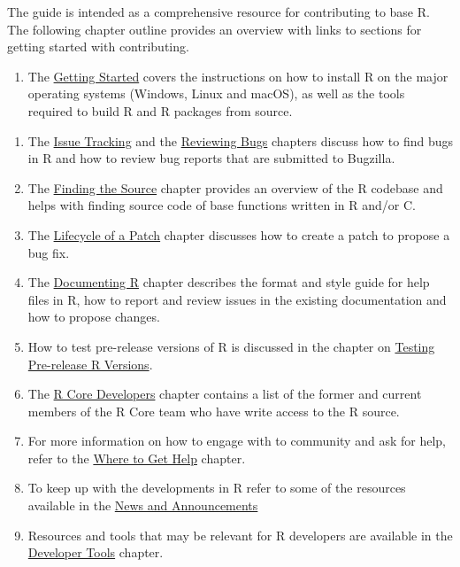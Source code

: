 \documentclass[
]{book}
\providecommand{\tightlist}{%
  \setlength{\itemsep}{0pt}\setlength{\parskip}{0pt}}
\begin{document}
The guide is intended as a comprehensive resource for contributing to base R. The following chapter outline provides an overview with links to sections for getting started with contributing.

\begin{enumerate}
\def\labelenumi{\arabic{enumi}.}
\tightlist
\item
  The \hyperref[GetStart]{Getting Started} covers the instructions on how to install R on the major operating systems (Windows, Linux and macOS), as well as the tools required to build R and R packages from source.
\end{enumerate}

\begin{enumerate}
\def\labelenumi{\arabic{enumi}.}
\setcounter{enumi}{1}
\item
  The \hyperref[IssueTrack]{Issue Tracking} and the \hyperref[ReviewBugs]{Reviewing Bugs} chapters discuss how to find bugs in R and how to review bug reports that are submitted to Bugzilla.
\item
  The \hyperref[FindSource]{Finding the Source} chapter provides an overview of the R codebase and helps with finding source code of base functions written in R and/or C.
\item
  The \hyperref[FixBug]{Lifecycle of a Patch} chapter discusses how to create a patch to propose a bug fix.
\item
  The \hyperref[Doc]{Documenting R} chapter describes the format and style guide for help files in R, how to report and review issues in the existing documentation and how to propose changes.
\item
  How to test pre-release versions of R is discussed in the chapter on \hyperref[TestRVer]{Testing Pre-release R Versions}.
\item
  The \hyperref[CoreDev]{R Core Developers} chapter contains a list of the former and current members of the R Core team who have write access to the R source.
\item
  For more information on how to engage with to community and ask for help, refer to the \hyperref[WhereToGetHelp]{Where to Get Help} chapter.
\item
  To keep up with the developments in R refer to some of the resources available in the \hyperref[News]{News and Announcements}
\item
  Resources and tools that may be relevant for R developers are available in the \hyperref[DevTools]{Developer Tools} chapter.
\end{enumerate}
\end{document}
